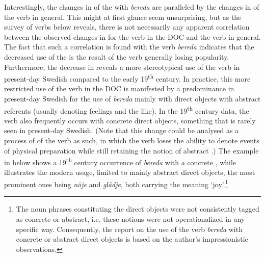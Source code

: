 \documentclass[output=paper]{langscibook}
\begin{document}
Interestingly, the changes in  of the  with \textit{bereda} are paralleled by the changes in  of the verb in general. This might at first glance seem unsurprising, but as the survey of verbs below reveals, there is not necessarily any apparent correlation between the observed changes in  for the verb in the DOC and the verb in general. The fact that such a correlation is found with the verb \textit{bereda} indicates that the decreased use of the  is the result of the verb generally losing popularity. Furthermore, the decrease in  reveals a more stereotypical use of the verb in present-day Swedish compared to the early 19\textsuperscript{th} century. In practice, this more restricted use of the verb in the DOC is manifested by a predominance in present-day Swedish for the use of \textit{bereda} mainly with direct objects with abstract referents (usually denoting feelings and the like). In the 19\textsuperscript{th} century data, the verb also frequently occurs with concrete direct objects, something that is rarely seen in present-day Swedish. (Note that this change could be analysed as a process of  of the verb as such, in which the verb loses the ability to denote events of physical preparation while still retaining the notion of abstract .) The example in  below shows a 19\textsuperscript{th} century occurrence of \textit{bereda} with a concrete , while  illustrates the modern usage, limited to mainly abstract direct objects, the most prominent ones being \textit{nöje} and \textit{glädje}, both carrying the meaning ‘joy’.\footnote{The noun phrases constituting the direct objects were not consistently tagged as concrete or abstract, i.e. these notions were not operationalized in any specific way. Consequently, the report on the use of the verb \textit{bereda} with concrete or abstract direct objects is based on the author’s impressionistic observations.}
\end{document}
